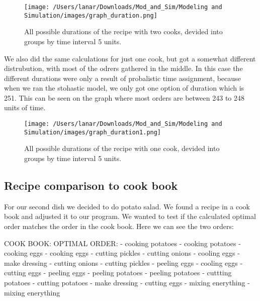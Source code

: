 \begin{figure}[H]
    \centerline{\texttt{[image: /Users/lanar/Downloads/Mod\_and\_Sim/Modeling and Simulation/images/graph\_duration.png]}}
    \caption{All possible durations of the recipe with two cooks, devided into groups by time interval 5 units.}
    \label{fig4}
\end{figure}

We also did the same calculations for just one cook, but got a somewhat different distrubution, with most of the odrers gathered in the middle. In this case the different durations were only a result of probalistic time assignment, 
because when we ran the stohastic model, we only got one option of duration which is 251. This can be seen on the graph where most orders are between 243 to 248 units of time. 

\begin{figure}[H]
    \centerline{\texttt{[image: /Users/lanar/Downloads/Mod\_and\_Sim/Modeling and Simulation/images/graph\_duration1.png]}}
    \caption{All possible durations of the recipe with one cook, devided into groups by time interval 5 units.}
    \label{fig5}
\end{figure}

\newpage
\subsection{Recipe comparison to cook book}
For our second dish we decided to do potato salad. We found a recipe in a cook book and adjusted it to our program. We wanted to test if the calculated optimal order matches the order in the cook book.
Here we can see the two orders:

\begin{verbnobox}[\fontsize{10pt}{10pt}\selectfont]
    COOK BOOK:                                  OPTIMAL ORDER:
    - cooking potatoes                          - cooking potatoes
    - cooking eggs                              - cooking eggs
    - cutting pickles                           - cutting onions
    - cooling eggs                              - make dressing
    - cutting onions                            - cutting pickles
    - peeling eggs                              - cooling eggs
    - cutting eggs                              - peeling eggs
    - peeling potatoes                          - peeling potatoes
    - cuttting potatoes                         - cutting potatoes
    - make dressing                             - cutting eggs
    - mixing enerything                         - mixing enerything
\end{verbnobox}

